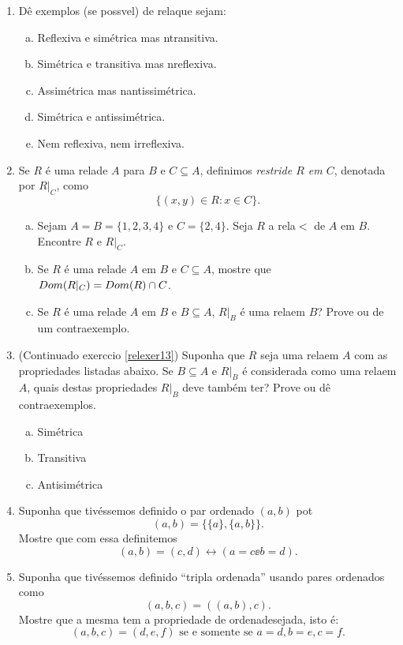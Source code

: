 \begin{enumerate}[{\bf 1.}]
\item D\^e exemplos (se poss\ih vel) de rela\coes que sejam:
\begin{enumerate}[a)]
\item Reflexiva e sim\'etrica mas n\ao transitiva.
\item Sim\'etrica e transitiva mas n\ao reflexiva.
\item Assim\'etrica mas n\ao antissim\'etrica.
\item Sim\'etrica e antissim\'etrica.
\item Nem reflexiva, nem irreflexiva.
\end{enumerate}

\item\label{relexer13} Se $R$ \'e uma rela\cao de $A$ para $B$ e $C\subseteq A$, definimos {\it restri\cao de $R$ em $C$}, denotada por $R|_C$, como
\[
\{(x,y)\in R: x\in C\}.
\]
\begin{enumerate}[a)]
\item Sejam $A=B=\{1,2,3,4\}$ e $C=\{2,4\}$. Seja $R$ a rela\cao $<$ de $A$ em $B$. Encontre $R$ e $R|_C$. 
\item Se $R$ \'e uma rela\cao de $A$ em $B$ e $C\subseteq A$, mostre que $Dom(R|_C)=Dom(R)\cap C$.
\item Se $R$ \'e uma rela\cao de $A$ em $B$ e $B\subseteq A$, $R|_B$ \'e uma rela\cao em $B$? Prove ou de um contraexemplo. 
\end{enumerate}

\item (Continua\cao do exerc\ih cio \ref{relexer13}) Suponha que $R$ seja uma rela\cao em $A$ com as propriedades listadas abaixo. Se $B\subseteq A$ e $R|_B$ \'e considerada como uma rela\cao em $A$, quais destas propriedades $R|_B$ deve tamb\'em ter? Prove ou d\^e contraexemplos.
\begin{enumerate}[a)]
\item Sim\'etrica 
\item Transitiva
\item Antisim\'etrica
\end{enumerate}

\item Suponha que tiv\'essemos definido o par ordenado $(a,b)$ pot
\[
(a,b)=\{\{a\},\{a,b\}\}.
\]
Mostre que com essa defini\cao temos
\[
(a,b)=(c,d)\leftrightarrow(a=c\ee b=d).
\]


\item Suponha que tiv\'essemos definido ``tripla ordenada'' usando pares ordenados como
\[
(a,b,c)=((a,b),c).
\]
Mostre que a mesma tem a propriedade de ordena\cao desejada, isto \'e:
\[
(a,b,c)=(d,e,f)\textrm{ se e somente se }a=d,b=e,c=f.
\]



\end{enumerate}
